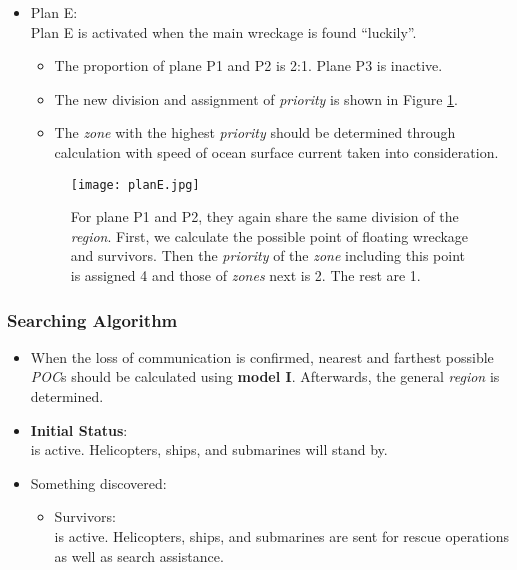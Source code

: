 \documentclass[a4paper,11pt]{article}
\begin{document}
\begin{spacing}{1.0}
\begin{itemize}
	
	\item Plan E:  
	\\Plan E is activated when the main wreckage is found ``luckily''.
	\begin{itemize}
		\item The proportion of plane P1 and P2 is 2:1. Plane P3 is inactive.
		\item The new division and assignment of \textit{priority} is shown in Figure \ref{planE}.
		\item The \textit{zone} with the highest \textit{priority} should be determined through calculation with speed of ocean surface current taken into consideration.
	\end{itemize}
	\begin{figure}[H]
		\centering
		\texttt{[image: planE.jpg]}
		\caption{For plane P1 and P2, they again share the same division of the \textit{region}. First, we calculate the possible point of floating wreckage and survivors. Then the \textit{priority} of the \textit{zone} including this point is assigned 4 and those of \textit{zones} next is 2. The rest are 1.}\label{planE}
	\end{figure}
		

\end{itemize}



\subsubsection*{Searching Algorithm}
\begin{itemize}
	\item When the loss of communication is confirmed, nearest and farthest possible \textit{POC}s should be calculated using \textbf{model I}. Afterwards, the general \textit{region} is determined.
	
	\item \textbf{Initial Status}:
	\\ is active. Helicopters, ships, and submarines  will stand by.
	
	\item Something discovered:
	
	\begin{itemize}
		\item Survivors:
		\\  is active. Helicopters, ships, and submarines are sent for rescue operations as well as search assistance.
		

\end{itemize}
\end{itemize}
\end{spacing}
\end{document}
